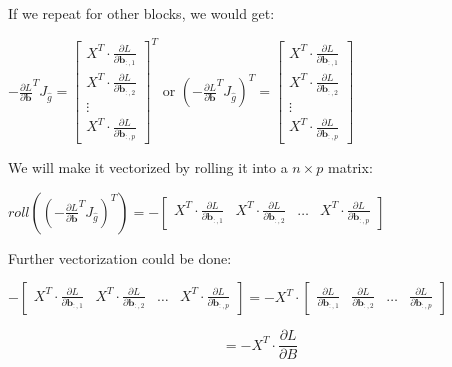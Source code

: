 \documentclass{article}
\begin{document}
If we repeat for other blocks, we would get:
\begin{center}
    $ -\frac{\partial L}{\partial \mathbf{b}}^{T} J_{\widehat{g}} = \begin{bmatrix}
    X^T \cdot \frac{\partial L}{\partial \mathbf{b}_{:,1}} \\ 
    X^T \cdot \frac{\partial L}{\partial \mathbf{b}_{:,2}} \\
    \vdots\\
    X^T \cdot \frac{\partial L}{\partial \mathbf{b}_{:,p}}
    \end{bmatrix}^T$ or $ (-\frac{\partial L}{\partial \mathbf{b}}^{T} J_{\widehat{g}})^T = \begin{bmatrix}
    X^T \cdot \frac{\partial L}{\partial \mathbf{b}_{:,1}} \\ 
    X^T \cdot \frac{\partial L}{\partial \mathbf{b}_{:,2}} \\
    \vdots\\
    X^T \cdot \frac{\partial L}{\partial \mathbf{b}_{:,p}}
    \end{bmatrix}$
\end{center}
We will make it vectorized by rolling it into a $n\times p$ matrix:
\begin{center}
    $roll((-\frac{\partial L}{\partial \mathbf{b}}^{T} J_{\widehat{g}})^T) = -\begin{bmatrix}
    X^T \cdot \frac{\partial L}{\partial \mathbf{b}_{:,1}} & 
    X^T \cdot \frac{\partial L}{\partial \mathbf{b}_{:,2}} &
    \hdots&
    X^T \cdot \frac{\partial L}{\partial \mathbf{b}_{:,p}}
    \end{bmatrix}$
\end{center}
Further vectorization could be done:
\begin{center}
    $-\begin{bmatrix}
    X^T \cdot \frac{\partial L}{\partial \mathbf{b}_{:,1}} & 
    X^T \cdot \frac{\partial L}{\partial \mathbf{b}_{:,2}} &
    \hdots&
    X^T \cdot \frac{\partial L}{\partial \mathbf{b}_{:,p}}
    \end{bmatrix} = -X^T \cdot \begin{bmatrix}
     \frac{\partial L}{\partial \mathbf{b}_{:,1}} & 
     \frac{\partial L}{\partial \mathbf{b}_{:,2}} &
    \hdots&
     \frac{\partial L}{\partial \mathbf{b}_{:,p}}
    \end{bmatrix}$
\end{center}
\begin{equation}
    = -X^T \cdot \frac{\partial L}{\partial B}
\end{equation}
\end{document}
